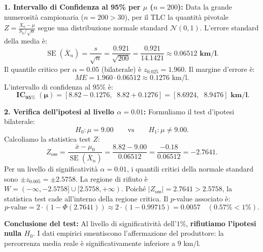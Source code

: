\documentclass[11pt,a4paper]{article}
\begin{document}
\begin{soluzionebox}
\textbf{1. Intervallo di Confidenza al 95\% per $\mu$ ($n = 200$):}
Data la grande numerosità campionaria ($n = 200 > 30$), per il TLC la quantità pivotale $Z = \frac{\overline{X}_n - \mu}{S_n/\sqrt{n}}$ segue una distribuzione normale standard $\mathcal{N}(0,1)$.
L'errore standard della media è:
\[
\operatorname{SE}(\overline{X}_n) = \frac{s}{\sqrt{n}} = \frac{0.921}{\sqrt{200}} = \frac{0.921}{14.1421} \approx \bm{0.06512\text{ km/l}}.
\]
Il quantile critico per $\alpha = 0.05$ (bilaterale) è $z_{0.025} = 1.960$.
Il margine d'errore è:
\[
ME = 1.960 \cdot 0.06512 \approx 0.1276\text{ km/l}.
\]
L'intervallo di confidenza al $95\%$ è:
\[
\mathbf{\operatorname{IC}_{95\%}(\mu) = [8.82 - 0.1276, \;\; 8.82 + 0.1276] = [8.6924, \;\; 8.9476]\text{ km/l}}.
\]

\textbf{2. Verifica dell'ipotesi al livello $\alpha = 0.01$:}
Formuliamo il test d'ipotesi bilaterale:
\[
H_0: \mu = 9.00 \qquad \text{vs} \qquad H_1: \mu \neq 9.00.
\]
Calcoliamo la statistica test $Z$:
\[
Z_{\text{oss}} = \frac{\overline{x} - \mu_0}{\operatorname{SE}(\overline{X}_n)} = \frac{8.82 - 9.00}{0.06512} = \frac{-0.18}{0.06512} = \bm{-2.7641}.
\]
Per un livello di significatività $\alpha = 0.01$, i quantili critici della normale standard sono $\pm z_{0.005} = \pm 2.5758$.
La regione di rifiuto è $W = (-\infty, -2.5758] \cup [2.5758, +\infty)$.
Poiché $|Z_{\text{oss}}| = 2.7641 > 2.5758$, la statistica test cade all'interno della regione critica.
Il $p$-value associato è:
\[
p\text{-value} = 2 \cdot (1 - \Phi(2.7641)) \approx 2 \cdot (1 - 0.99715) = \bm{0.0057} \quad (\bm{0.57\%} < 1\%).
\]

\textbf{Conclusione del test:}
Al livello di significatività dell'$1\%$, \textbf{rifiutiamo l'ipotesi nulla $H_0$}. I dati empirici smentiscono l'affermazione del produttore: la percorrenza media reale è significativamente inferiore a $9\text{ km/l}$.
\end{soluzionebox}
\end{document}
